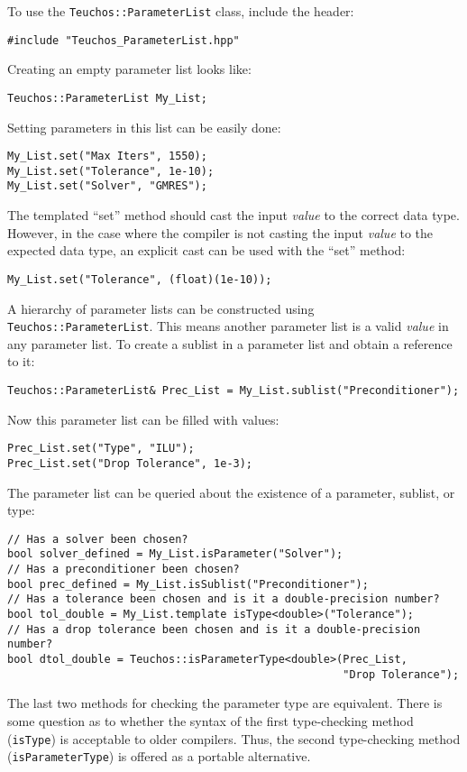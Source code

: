 To use the \verb!Teuchos::ParameterList! class, include the header:
{\small 
\begin{verbatim}
#include "Teuchos_ParameterList.hpp"
\end{verbatim}}
Creating an empty parameter list looks like:
{\small 
\begin{verbatim}
Teuchos::ParameterList My_List;
\end{verbatim}}
Setting parameters in this list can be easily done:
{\small
\begin{verbatim}
My_List.set("Max Iters", 1550);
My_List.set("Tolerance", 1e-10);
My_List.set("Solver", "GMRES");
\end{verbatim}}
The templated ``set'' method should cast the input {\it value} to the
correct data type.  However, in the case where the compiler is not casting the input
{\it value} to the expected data type, an explicit cast can be used with the ``set'' method:
{\small
\begin{verbatim}
My_List.set("Tolerance", (float)(1e-10));
\end{verbatim}}
A hierarchy of parameter lists can be constructed using {\tt Teuchos::ParameterList}.  This 
means another parameter list is a valid {\it value} in any parameter list.  To create a sublist
in a parameter list and obtain a reference to it:
{\small
\begin{verbatim}
Teuchos::ParameterList& Prec_List = My_List.sublist("Preconditioner");
\end{verbatim}}
Now this parameter list can be filled with values:
{\small
\begin{verbatim}
Prec_List.set("Type", "ILU");
Prec_List.set("Drop Tolerance", 1e-3);
\end{verbatim}}
The parameter list can be queried about the existence of a parameter, sublist, or type:
{\small
\begin{verbatim}
// Has a solver been chosen?
bool solver_defined = My_List.isParameter("Solver");
// Has a preconditioner been chosen?
bool prec_defined = My_List.isSublist("Preconditioner"); 
// Has a tolerance been chosen and is it a double-precision number?
bool tol_double = My_List.template isType<double>("Tolerance");
// Has a drop tolerance been chosen and is it a double-precision number?
bool dtol_double = Teuchos::isParameterType<double>(Prec_List,
                                                    "Drop Tolerance"); 
\end{verbatim}}
\noindent The last two methods for checking the parameter type are equivalent.
There is some question as to whether the syntax of the first type-checking
method ({\tt isType}) is acceptable to older compilers.  Thus, the second type-checking 
method ({\tt isParameterType}) is offered as a portable alternative.

